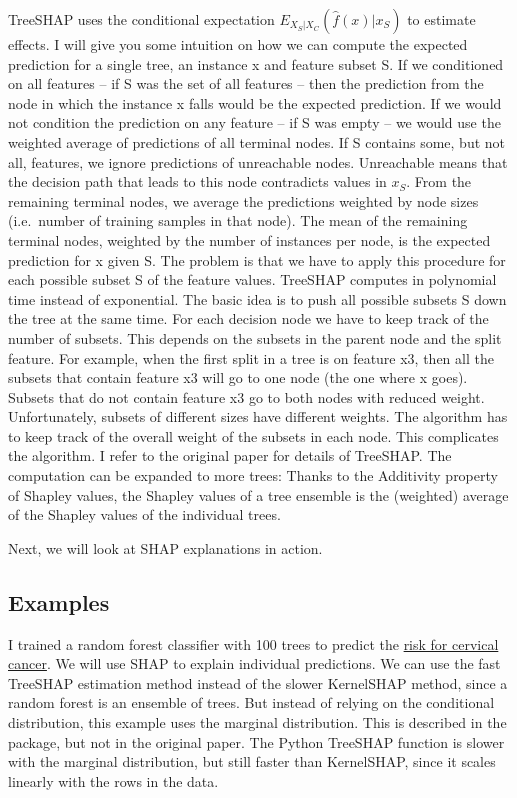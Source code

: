 \documentclass[
  11pt,
]{scrbook}
\begin{document}
TreeSHAP uses the conditional expectation \(E_{X_S|X_C}(\hat{f}(x)|x_S)\) to estimate effects.
I will give you some intuition on how we can compute the expected prediction for a single tree, an instance x and feature subset S.
If we conditioned on all features -- if S was the set of all features -- then the prediction from the node in which the instance x falls would be the expected prediction.
If we would not condition the prediction on any feature -- if S was empty -- we would use the weighted average of predictions of all terminal nodes.
If S contains some, but not all, features, we ignore predictions of unreachable nodes.
Unreachable means that the decision path that leads to this node contradicts values in \(x_S\).
From the remaining terminal nodes, we average the predictions weighted by node sizes (i.e.~number of training samples in that node).
The mean of the remaining terminal nodes, weighted by the number of instances per node, is the expected prediction for x given S.
The problem is that we have to apply this procedure for each possible subset S of the feature values.
TreeSHAP computes in polynomial time instead of exponential.
The basic idea is to push all possible subsets S down the tree at the same time.
For each decision node we have to keep track of the number of subsets.
This depends on the subsets in the parent node and the split feature.
For example, when the first split in a tree is on feature x3, then all the subsets that contain feature x3 will go to one node (the one where x goes).
Subsets that do not contain feature x3 go to both nodes with reduced weight.
Unfortunately, subsets of different sizes have different weights.
The algorithm has to keep track of the overall weight of the subsets in each node.
This complicates the algorithm.
I refer to the original paper for details of TreeSHAP.
The computation can be expanded to more trees:
Thanks to the Additivity property of Shapley values, the Shapley values of a tree ensemble is the (weighted) average of the Shapley values of the individual trees.

Next, we will look at SHAP explanations in action.

\hypertarget{examples-5}{%
\subsection{Examples}\label{examples-5}}

I trained a random forest classifier with 100 trees to predict the \protect\hyperlink{cervical}{risk for cervical cancer}.
We will use SHAP to explain individual predictions.
We can use the fast TreeSHAP estimation method instead of the slower KernelSHAP method, since a random forest is an ensemble of trees.
But instead of relying on the conditional distribution, this example uses the marginal distribution.
This is described in the package, but not in the original paper.
The Python TreeSHAP function is slower with the marginal distribution, but still faster than KernelSHAP, since it scales linearly with the rows in the data.
\end{document}
